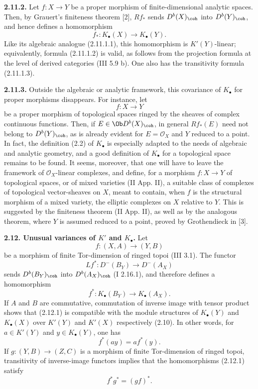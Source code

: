 \textbf{2.11.2.} Let \(f:X\to Y\) be a proper morphism of finite-dimensional analytic spaces. Then, by Grauert's finiteness theorem [2], \(Rf_*\) sends \(D^b(X)_{\coh}\) into \(D^b(Y)_{\coh}\), and hence defines a homomorphism
\begin{equation}\tag{2.11.2.1}
 f_*:K_{\bullet}(X)\longrightarrow K_{\bullet}(Y).
\end{equation}
Like its algebraic analogue (2.11.1.1), this homomorphism is \(K'(Y)\)-linear; equivalently, formula (2.11.1.2) is valid, as follows from the projection formula at the level of derived categories (III 5.9 b). One also has the transitivity formula (2.11.1.3).

\textbf{2.11.3.} Outside the algebraic or analytic framework, this covariance of \(K_{\bullet}\) for proper morphisms disappears. For instance, let
\[
 f:X\to Y
\]
be a proper morphism of topological spaces ringed by the sheaves of complex continuous functions. Then, if \(E\in\Ob D^b(X)_{\coh}\), in general \(Rf_*(E)\) need not belong to \(D^b(Y)_{\coh}\), as is already evident for \(E=\mathcal O_X\) and \(Y\) reduced to a point. In fact, the definition (2.2) of \(K_{\bullet}\) is especially adapted to the needs of algebraic and analytic geometry, and a good definition of \(K_{\bullet}\) for a topological space remains to be found. It seems, moreover, that one will have to leave the framework of \(\mathcal O_X\)-linear complexes, and define, for a morphism \(f:X\to Y\) of topological spaces, or of mixed varieties (II App. II), a suitable class of complexes of topological vector-sheaves on \(X\), meant to contain, when \(f\) is the structural morphism of a mixed variety, the elliptic complexes on \(X\) relative to \(Y\). This is suggested by the finiteness theorem (II App. II), as well as by the analogous theorem, where \(Y\) is assumed reduced to a point, proved by Grothendieck in [3].

\textbf{2.12. Unusual variances of \(K'\) and \(K_{\bullet}\).} Let
\[
 f:(X,A)\longrightarrow(Y,B)
\]
be a morphism of finite Tor-dimension of ringed topoi (III 3.1). The functor
\[
 Lf^*:D^-(B_Y)\longrightarrow D^-(A_X)
\]
sends \(D^b(B_Y)_{\coh}\) into \(D^b(A_X)_{\coh}\) (I 2.16.1), and therefore defines a homomorphism
\begin{equation}\tag{2.12.1}
 f^*:K_{\bullet}(B_Y)\longrightarrow K_{\bullet}(A_X).
\end{equation}
If \(A\) and \(B\) are commutative, commutation of inverse image with tensor product shows that (2.12.1) is compatible with the module structures of \(K_{\bullet}(Y)\) and \(K_{\bullet}(X)\) over \(K'(Y)\) and \(K'(X)\) respectively (2.10). In other words, for \(a\in K'(Y)\) and \(y\in K_{\bullet}(Y)\), one has
\begin{equation}\tag{2.12.2}
 f^*(ay)=a f^*(y).
\end{equation}
If \(g:(Y,B)\to(Z,C)\) is a morphism of finite Tor-dimension of ringed topoi, transitivity of inverse-image functors implies that the homomorphisms (2.12.1) satisfy
\begin{equation}\tag{2.12.1.1}
 f^*g^*=(gf)^*.
\end{equation}

